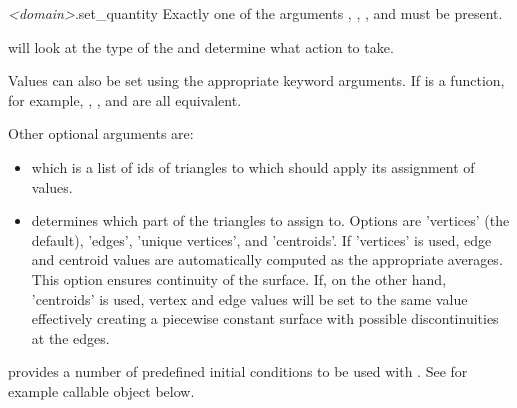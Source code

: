 \documentclass{manual}
\begin{document}
\begin{methoddesc}{\emph{<domain>}.set_quantity}
Exactly one of the arguments , , ,
 and  must be present.

 will look at the type of the  and
determine what action to take.

Values can also be set using the appropriate keyword arguments.
If  is a function, for example, , ,
and  are all equivalent.

Other optional arguments are:
\begin{itemize}
  \item {} which is a list of ids of triangles to which 
        should apply its assignment of values.
  \item {} determines which part of the triangles to assign to.
        Options are 'vertices' (the default), 'edges', 'unique vertices', and 'centroids'.
        If 'vertices' is used, edge and centroid values are automatically computed as the
        appropriate averages. This option ensures continuity of the surface.
        If, on the other hand, 'centroids' is used, vertex and edge values will be set to the
        same value effectively creating a piecewise constant surface with possible
        discontinuities at the edges.
\end{itemize}

\anuga provides a number of predefined initial conditions to be used
with . See for example callable object  below.
\end{methoddesc}
\end{document}
